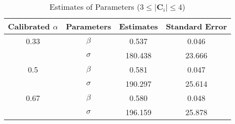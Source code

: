 \begin{table}[H]
    \centering
    \caption{Estimates of Parameters ($3 \leq |\mathbf{C}_i| \leq 4$)}
    \label{table: estimates (min_size=3 max_size=4 margin=2000)}
    \begin{tabular}{cccc}
        \toprule
        Calibrated $\alpha$ & Parameters & Estimates & Standard Error \\
        \midrule
        0.33                & $\beta$    & 0.537     & 0.046          \\
                            & $\sigma$   & 180.438   & 23.666         \\
        \midrule
        0.5                 & $\beta$    & 0.581     & 0.047          \\
                            & $\sigma$   & 190.297   & 25.614         \\
        \midrule
        0.67                & $\beta$    & 0.580     & 0.048          \\
                            & $\sigma$   & 196.159   & 25.878         \\
        \bottomrule
    \end{tabular}
\end{table}
